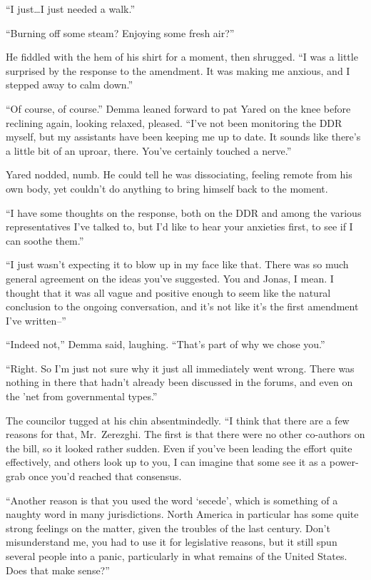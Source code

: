 ``I just\ldots I just needed a walk.''

``Burning off some steam? Enjoying some fresh air?''

He fiddled with the hem of his shirt for a moment, then shrugged. ``I was a little surprised by the response to the amendment. It was making me anxious, and I stepped away to calm down.''

``Of course, of course.'' Demma leaned forward to pat Yared on the knee before reclining again, looking relaxed, pleased. ``I've not been monitoring the DDR myself, but my assistants have been keeping me up to date. It sounds like there's a little bit of an uproar, there. You've certainly touched a nerve.''

Yared nodded, numb. He could tell he was dissociating, feeling remote from his own body, yet couldn't do anything to bring himself back to the moment.

``I have some thoughts on the response, both on the DDR and among the various representatives I've talked to, but I'd like to hear your anxieties first, to see if I can soothe them.''

``I just wasn't expecting it to blow up in my face like that. There was so much general agreement on the ideas you've suggested. You and Jonas, I mean. I thought that it was all vague and positive enough to seem like the natural conclusion to the ongoing conversation, and it's not like it's the first amendment I've written--''

``Indeed not,'' Demma said, laughing. ``That's part of why we chose you.''

``Right. So I'm just not sure why it just all immediately went wrong. There was nothing in there that hadn't already been discussed in the forums, and even on the 'net from governmental types.''

The councilor tugged at his chin absentmindedly. ``I think that there are a few reasons for that, Mr.~Zerezghi. The first is that there were no other co-authors on the bill, so it looked rather sudden. Even if you've been leading the effort quite effectively, and others look up to you, I can imagine that some see it as a power-grab once you'd reached that consensus.

``Another reason is that you used the word `secede', which is something of a naughty word in many jurisdictions. North America in particular has some quite strong feelings on the matter, given the troubles of the last century. Don't misunderstand me, you had to use it for legislative reasons, but it still spun several people into a panic, particularly in what remains of the United States. Does that make sense?''

